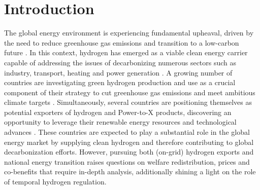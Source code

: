 \documentclass[5p,numafflabel]{elsarticle}
\newcommand{\co}{\ce{CO2}~}
\def\co{CO${}_2${\:}}
\begin{document}



% 


\onecolumn

\linenumbers


\section*{Introduction}
\label{sec:intro}

The global energy environment is experiencing fundamental upheaval, driven by the need to reduce greenhouse gas emissions and transition to a low-carbon future \cite{Davis2018, Victoria2020}. 
In this context, hydrogen has emerged as a viable clean energy carrier capable of addressing the issues of decarbonizing numerous sectors such as industry, transport, heating and power generation \cite{IEA2021,Ueckerdt2021, Gailani2024, Kovac2021, Azadnia2023}. 
A growing number of countries are investigating green hydrogen production and use as a crucial component of their strategy to cut greenhouse gas emissions and meet ambitious climate targets \cite{IEA2021, Zeyen2023}.
Simultaneously, several countries are positioning themselves as potential exporters of hydrogen and Power-to-X products, discovering an opportunity to leverage their renewable energy resources and technological advances \cite{InternationalEnergyAgency2024}.
These countries are expected to play a substantial role in the global energy market by supplying clean hydrogen and therefore contributing to global decarbonization efforts\cite{InternationalEnergyAgency2024}. However, pursuing both (on-grid) hydrogen exports and national energy transition raises questions on welfare redistribution, prices and co-benefits that require in-depth analysis, additionally shining a light on the role of temporal hydrogen regulation.
\end{document}
